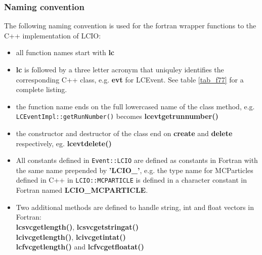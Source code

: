 \subsubsection{Naming convention}
The following naming convention is used for the fortran wrapper functions to the 
C++ implementation of LCIO:
\begin{itemize}

\item{all function names start with {\bf lc}}

\item{{\bf lc} is followed by a three letter acronym that uniquley identifies the 
corresponding C++ class, e.g. {\bf evt} for LCEvent.} See table \ref{tab_f77} for a complete 
listing.

\item{the function name ends on the full lowercased name of the class method, e.g. \\
 \verb$LCEventImpl::getRunNumber()$ becomes  {\bf lcevtgetrunnumber() } }

\item{the constructor and destructor of the class  end on {\bf create} and {\bf delete} 
respectively, eg. {\bf lcevtdelete()} }

\item{All constants defined in \verb$Event::LCIO$ are defined as constants in Fortran with the 
same name prepended by {\bf 'LCIO\_'}, e.g. the type name for MCParticles defined in C++ in
\verb$LCIO::MCPARTICLE$ is defined in a character constant in Fortran named
{\bf LCIO\_MCPARTICLE}.}

\item{Two additional methods are defined to handle string, int and float vectors in Fortran:\\
{\bf lcsvcgetlength()}, {\bf lcsvcgetstringat()}  \\
{\bf lcivcgetlength()}, {\bf lcivcgetintat()}  \\
{\bf lcfvcgetlength()} and {\bf lcfvcgetfloatat()} 
}
\end{itemize}

